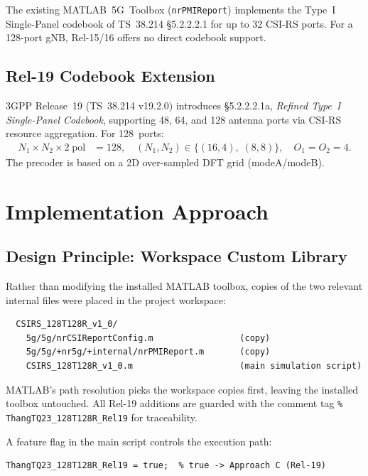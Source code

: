 \documentclass[11pt,a4paper]{article}
\begin{document}
The existing MATLAB~5G~Toolbox (\texttt{nrPMIReport}) implements the Type~I
Single-Panel codebook of TS~38.214 \S5.2.2.2.1 for up to 32 CSI-RS ports.
For a 128-port gNB, Rel-15/16 offers no direct codebook support.

\subsection{Rel-19 Codebook Extension}

3GPP Release~19 (TS~38.214 v19.2.0) introduces \S5.2.2.2.1a,
\emph{Refined Type~I Single-Panel Codebook}, supporting 48, 64, and 128 antenna
ports via CSI-RS resource aggregation. For 128~ports:
\begin{align}
  N_1 \times N_2 \times 2 \;\text{pol} &= 128, \quad
  (N_1,N_2) \in \{(16,4),\;(8,8)\}, \quad O_1 = O_2 = 4.
\end{align}
The precoder is based on a 2D over-sampled DFT grid (modeA/modeB).

\section{Implementation Approach}

\subsection{Design Principle: Workspace Custom Library}

Rather than modifying the installed MATLAB toolbox, copies of the two relevant
internal files were placed in the project workspace:
\begin{verbatim}
  CSIRS_128T128R_v1_0/
    5g/5g/nrCSIReportConfig.m                 (copy)
    5g/5g/+nr5g/+internal/nrPMIReport.m       (copy)
    CSIRS_128T128R_v1_0.m                     (main simulation script)
\end{verbatim}
MATLAB's path resolution picks the workspace copies first, leaving the
installed toolbox untouched. All Rel-19 additions are guarded with the
comment tag \texttt{\% ThangTQ23\_128T128R\_Rel19} for traceability.

A feature flag in the main script controls the execution path:
\begin{lstlisting}
ThangTQ23_128T128R_Rel19 = true;  % true -> Approach C (Rel-19)
\end{lstlisting}
\end{document}
